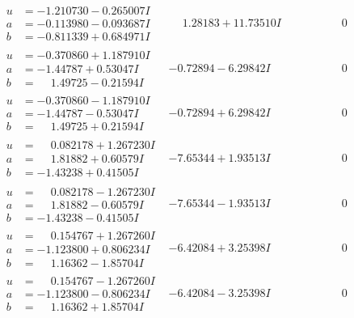 \documentclass[1p]{elsarticle_modified}
\theoremstyle{definition}
\begin{document}
$$\begin{array}{c|c|c}
\begin{aligned}
u &= -1.210730 - 0.265007 I \\
a &= -0.113980 - 0.093687 I \\
b &= -0.811339 + 0.684971 I\end{aligned}
 & \phantom{-}1.28183 + 11.73510 I & \phantom{-0.000000 } 0 \\ \hline\begin{aligned}
u &= -0.370860 + 1.187910 I \\
a &= -1.44787 + 0.53047 I \\
b &= \phantom{-}1.49725 - 0.21594 I\end{aligned}
 & -0.72894 - 6.29842 I & \phantom{-0.000000 } 0 \\ \hline\begin{aligned}
u &= -0.370860 - 1.187910 I \\
a &= -1.44787 - 0.53047 I \\
b &= \phantom{-}1.49725 + 0.21594 I\end{aligned}
 & -0.72894 + 6.29842 I & \phantom{-0.000000 } 0 \\ \hline\begin{aligned}
u &= \phantom{-}0.082178 + 1.267230 I \\
a &= \phantom{-}1.81882 + 0.60579 I \\
b &= -1.43238 + 0.41505 I\end{aligned}
 & -7.65344 + 1.93513 I & \phantom{-0.000000 } 0 \\ \hline\begin{aligned}
u &= \phantom{-}0.082178 - 1.267230 I \\
a &= \phantom{-}1.81882 - 0.60579 I \\
b &= -1.43238 - 0.41505 I\end{aligned}
 & -7.65344 - 1.93513 I & \phantom{-0.000000 } 0 \\ \hline\begin{aligned}
u &= \phantom{-}0.154767 + 1.267260 I \\
a &= -1.123800 + 0.806234 I \\
b &= \phantom{-}1.16362 - 1.85704 I\end{aligned}
 & -6.42084 + 3.25398 I & \phantom{-0.000000 } 0 \\ \hline\begin{aligned}
u &= \phantom{-}0.154767 - 1.267260 I \\
a &= -1.123800 - 0.806234 I \\
b &= \phantom{-}1.16362 + 1.85704 I\end{aligned}
 & -6.42084 - 3.25398 I & \phantom{-0.000000 } 0 \\ \hline\begin{aligned}

\end{aligned}
\end{array}$$
\end{document}
